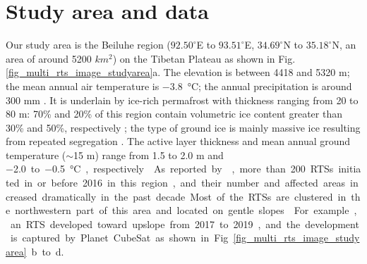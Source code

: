 \documentclass[authoryear,preprint,review,12pt]{elsarticle}
\begin{document}
\section{Study area and data}
\label{sec_studyarea_data}

Our study area is the Beiluhe region ($92.50^\circ$E to $93.51^\circ$E, $34.69^\circ$N to $35.18^\circ$N, an area of around 5200 $km^2$) on the Tibetan Plateau as shown in Fig. \ref{fig_multi_rts_image_studyarea}a.
The elevation is between 4418 and 5320 m; the mean annual air temperature is \SI{-3.8}{\celsius}; the annual precipitation is around 300 mm  \citep{luo_thermokarst_2015}.
It is underlain by ice-rich permafrost with thickness ranging from 20 to 80 m: 70\% and 20\% of this region contain volumetric ice content greater than 30\% and 50\%, respectively \citep{zhou_geocryology_2000, luo_thermokarst_2015}; 
the type of ground ice is mainly massive ice resulting from repeated segregation \citep{guodong1983mechanism}. 
The active layer thickness and mean annual ground temperature ($\sim$15 m) range from 1.5 to 2.0 m and \SI{-2.0} to \SI{-0.5}{\celsius}, respectively \citep{zhou_geocryology_2000, wu2010changes, luo_thermokarst_2015,  wu2015changes}. 
As reported by \cite{luo2019recent}, more than 200 RTSs initiated in or before 2016 in this region,  and their number and affected areas increased dramatically in the past decade. 
Most of the RTSs are clustered in the northwestern part of this area and located on gentle slopes \citep{huang2020using}.
For example, an RTS developed toward upslope from 2017 to 2019, and the development is captured by Planet CubeSat as shown in Fig. \ref{fig_multi_rts_image_studyarea}b to d. 

\end{document}
